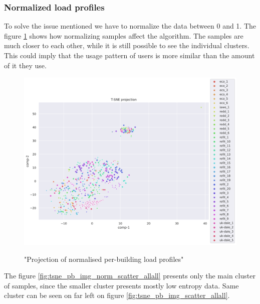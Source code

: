 \subsubsection{Normalized load profiles}

To solve the issue mentioned we have to normalize the data between 0 and 1.
The figure \ref{fig:tsne_pb_scatter_all_all} shows how normalizing samples affect the algorithm.
The samples are much closer to each other, while it is still possible to see the individual clusters.
This could imply that the usage pattern of users is more similar than the amount of it they use.

\begin{figure}[H]
	\centering
	\caption{"Projection of normalised per-building load profiles"}
	\includegraphics[width=1.2\textwidth]{Figures/TSNE/TSNE_per_building/all/scatter_all_all.png}
	\label{fig:tsne_pb_scatter_all_all}
\end{figure}

The figure \ref{fig:tsne_pb_img_norm_scatter_allall} presents only the main cluster of samples,
since the smaller cluster presents mostly low entropy data. 
Same cluster can be seen on far left on figure \ref{fig:tsne_pb_img_scatter_allall}.

